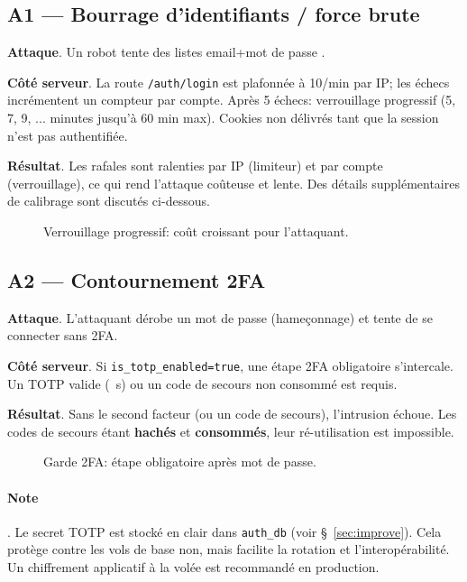 \subsection*{A1 — Bourrage d'identifiants / force brute}
\textbf{Attaque}. Un robot tente des listes \og email+mot de passe \fg{}.

\textbf{Côté serveur}. La route \texttt{/auth/login} est plafonnée à 10/min par IP; les échecs incrémentent un compteur par compte. Après 5 échecs: verrouillage progressif (5, 7, 9, ... minutes jusqu'à 60 min max). Cookies non délivrés tant que la session n'est pas authentifiée.

\textbf{Résultat}. Les rafales sont ralenties par IP (limiteur) et par compte (verrouillage), ce qui rend l'attaque coûteuse et lente. Des détails supplémentaires de calibrage sont discutés ci-dessous.

\begin{figure}[h]
  \centering
  \caption{Verrouillage progressif: coût croissant pour l'attaquant.}
\end{figure}

\subsection*{A2 — Contournement 2FA}
\textbf{Attaque}. L'attaquant dérobe un mot de passe (hameçonnage) et tente de se connecter sans 2FA.

\textbf{Côté serveur}. Si \texttt{is\_totp\_enabled=true}, une étape 2FA obligatoire s'intercale. Un TOTP valide (~s) ou un code de secours non consommé est requis.

\textbf{Résultat}. Sans le second facteur (ou un code de secours), l'intrusion échoue. Les codes de secours étant \textbf{hachés} et \textbf{consommés}, leur ré-utilisation est impossible.

\begin{figure}[h]
  \centering
  \caption{Garde 2FA: étape obligatoire après mot de passe.}
\end{figure}

\paragraph{Note}. Le secret TOTP est stocké en clair dans \texttt{auth\_db} (voir \S~\ref{sec:improve}). Cela protège contre les vols de base non, mais facilite la rotation et l'interopérabilité. Un chiffrement applicatif à la volée est recommandé en production.

